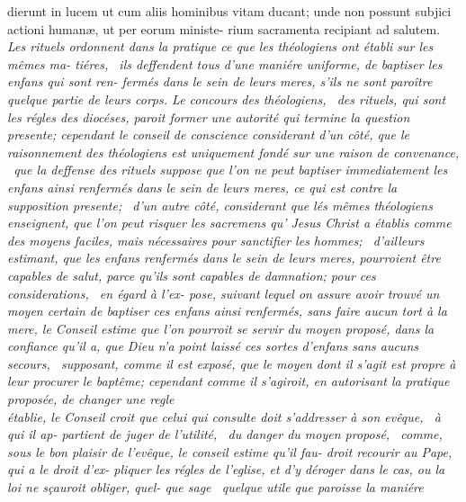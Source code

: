 \documentclass{article}
\begin{document}
\newpage
\bgroup\fontsize{10}{13}\selectfont\noindent
dierunt in lucem ut cum aliis hominibus\break
vitam ducant; unde non possunt subjici\break
actioni humanæ, ut per eorum ministe-\break
rium sacramenta recipiant ad salutem.\break
\fontsize{9}{13}\selectfont\itshape Les rituels ordonnent dans la
pratique ce que\break
les théologiens ont établi sur les mêmes ma-\break
tiéres, \et\  ils deffendent tous d’une maniére\break
uniforme, de baptiser les enfans qui sont ren-\break
fermés dans le sein de leurs meres, s’ils ne\break
sont paroître quelque partie de leurs corps.\break 
Le concours des théologiens, \et\  des rituels, qui sont les régles des diocéses, paroit former une
autorité qui termine la question presente; cependant le conseil de conscience
considerant d’un côté, que le raisonnement des théologiens est uniquement fondé sur
une raison de convenance, \et\  que la deffense des rituels suppose que l’on ne peut
baptiser immediatement les enfans ainsi renfermés dans le sein de leurs meres, ce
qui est contre la supposition presente; \et\  d’un autre côté, considerant que lés
mêmes
théologiens enseignent, que l’on peut risquer\break
les sacremens qu’ {\upshape Jesus Christ} a établis comme\break
des moyens faciles, mais nécessaires pour\break 
sanctifier les hommes; \et\  d’ailleurs estimant,\break
que les enfans renfermés dans le sein de leurs\break
meres, pourroient être capables de salut,\break
parce qu’ils sont capables de damnation;\tsk\break  
pour ces considerations, \et\  en égard à l’ex-\break
pose, suivant lequel on assure avoir trouvé\break
un moyen certain de baptiser ces enfans ainsi\break
renfermés, sans faire aucun tort à la mere,\break
le Conseil estime que l’on pourroit se servir du\break
moyen proposé, dans la confiance qu’il a, que\break
Dieu n’a point laissé ces sortes d’enfans\break
sans aucuns secours, \et\  supposant, comme\break
il est exposé, que le moyen dont il s’agit est\break
propre à leur procurer le baptême; cependant\break
comme il s’agiroit, en autorisant la pratique\break
proposée, de changer une regle \\
établie, le Conseil croit que celui qui consulte\break
doit s’addresser à son evêque, \et\  à qui il ap-
partient de juger de l’utilité, \et\  du danger\break
du moyen proposé, \et\  comme, sous le bon\break
plaisir de l’evêque, le conseil estime qu’il fau-\break
droit recourir au Pape, qui a le droit d’ex-\break
pliquer les régles de l’eglise, et d’y déroger\break
dans le cas, ou la loi ne sçauroit obliger, quel-\break
que sage \et\  quelque utile que paroisse la maniére\break
\end{document}
